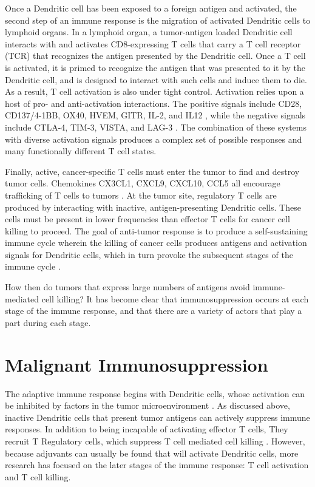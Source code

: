 Once a Dendritic cell has been exposed to a foreign antigen and activated, the second step of an immune response is the migration of activated Dendritic cells to lymphoid organs. 
In a lymphoid organ, a tumor-antigen loaded Dendritic cell interacts with and activates CD8-expressing T cells that carry a T cell receptor (TCR) that recognizes the antigen presented by the Dendritic cell. 
Once a T cell is activated, it is primed to recognize the antigen that was presented to it by the Dendritic cell, and is designed to interact with such cells and induce them to die. 
As a result, T cell activation is also under tight control. 
Activation relies upon a host of pro- and anti-activation interactions. 
The positive signals include CD28, CD137/4-1BB, OX40, HVEM, GITR, IL-2, and IL12 \citep{Franciszkiewicz2012,Lippitz2013}, while the negative signals include CTLA-4, TIM-3, VISTA, and LAG-3 \citep{Sharma2017}.
The combination of these systems with diverse activation signals produces a complex set of possible responses and many functionally different T cell states.

Finally, active, cancer-specific T cells must enter the tumor to find and destroy tumor cells. 
Chemokines CX3CL1, CXCL9, CXCL10, CCL5 all encourage trafficking of T cells to tumors \citep{Franciszkiewicz2012}.
At the tumor site, regulatory T cells are produced by interacting with inactive, antigen-presenting Dendritic cells. 
These cells must be present in lower frequencies than effector T cells for cancer cell killing to proceed. 
The goal of anti-tumor response is to produce a self-sustaining immune cycle wherein the killing of cancer cells produces antigens and activation signals for Dendritic cells, which in turn provoke the subsequent stages of the immune cycle \citep{Chen2013}.

How then do tumors that express large numbers of antigens avoid immune-mediated cell killing? 
It has become clear that immunosuppression occurs at each stage of the immune response, and that there are a variety of actors that play a part during each stage. 

\section{Malignant Immunosuppression}

The adaptive immune response begins with Dendritic cells, whose activation can be inhibited by factors in the tumor microenvironment \citep{Michielsen2012,Chevalier2017}. 
As discussed above, inactive Dendritic cells that present tumor antigens can actively suppress immune responses. 
In addition to being incapable of activating effector T cells, They recruit T Regulatory cells, which suppress T cell mediated cell killing \citep{Ohta2006,Curiel2004}. 
However, because adjuvants can usually be found that will activate Dendritic cells, more research has focused on the later stages of the immune response: T cell activation and T cell killing. 

